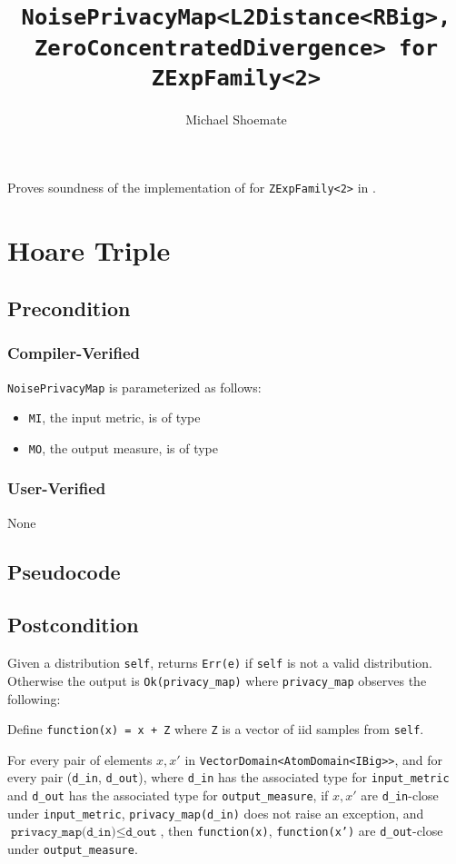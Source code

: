 \documentclass{article}
\title{\texttt{NoisePrivacyMap<L2Distance<RBig>, ZeroConcentratedDivergence> for ZExpFamily<2>}}
\author{Michael Shoemate}
\date{}
\begin{document}
\maketitle

\contrib
Proves soundness of the implementation of  for \texttt{ZExpFamily<2>} in .

\section{Hoare Triple}
\subsection*{Precondition}
\subsubsection*{Compiler-Verified}
\texttt{NoisePrivacyMap} is parameterized as follows:
\begin{itemize}
    \item \texttt{MI}, the input metric, is of type 
    \item \texttt{MO}, the output measure, is of type 
\end{itemize}

\subsubsection*{User-Verified}
None

\subsection*{Pseudocode}


\subsection*{Postcondition}
\begin{theorem}
    Given a distribution \texttt{self},
    returns \texttt{Err(e)} if \texttt{self} is not a valid distribution.
    Otherwise the output is \texttt{Ok(privacy\_map)}
    where \texttt{privacy\_map} observes the following:

    Define \texttt{function(x) = x + Z} where \texttt{Z} is a vector of iid samples from \texttt{self}.

    For every pair of elements $x, x'$ in \texttt{VectorDomain<AtomDomain<IBig>{}>},
    and for every pair (\texttt{d\_in}, \texttt{d\_out}),
    where \texttt{d\_in} has the associated type for \texttt{input\_metric} and \texttt{d\_out} has the associated type for \texttt{output\_measure},
    if $x, x'$ are \texttt{d\_in}-close under \texttt{input\_metric}, \texttt{privacy\_map(d\_in)} does not raise an exception,
    and $\texttt{privacy\_map(d\_in)} \leq \texttt{d\_out}$,
    then \texttt{function(x)}, \texttt{function(x')} are \texttt{d\_out}-close under \texttt{output\_measure}.
\end{theorem}
\end{document}
